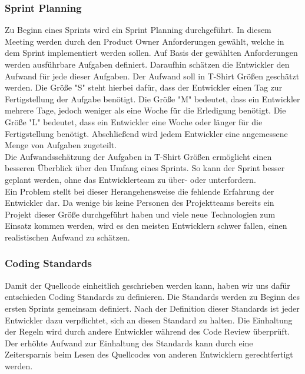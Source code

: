 \documentclass{article}
\begin{document}
\subsubsection{Sprint Planning}
Zu Beginn eines Sprints wird ein Sprint Planning durchgeführt.
In diesem Meeting werden durch den Product Owner Anforderungen gewählt, welche in dem Sprint implementiert werden sollen.
Auf Basis der gewählten Anforderungen werden ausführbare Aufgaben definiert.
Daraufhin schätzen die Entwickler den Aufwand für jede dieser Aufgaben.
Der Aufwand soll in T-Shirt Größen geschätzt werden.
Die Größe "S" steht hierbei dafür, dass der Entwickler einen Tag zur Fertigstellung der Aufgabe benötigt.
Die Größe "M" bedeutet, dass ein Entwickler mehrere Tage, jedoch weniger als eine Woche für die Erledigung benötigt.
Die Größe "L" bedeutet, dass ein Entwickler eine Woche oder länger für die Fertigstellung benötigt.
Abschließend wird jedem Entwickler eine angemessene Menge von Aufgaben zugeteilt.\\
Die Aufwandsschätzung der Aufgaben in T-Shirt Größen ermöglicht einen besseren Überblick über den Umfang eines Sprints.
So kann der Sprint besser geplant werden, ohne das Entwicklerteam zu über- oder unterfordern.\\
Ein Problem stellt bei dieser Herangehensweise die fehlende Erfahrung der Entwickler dar.
Da wenige bis keine Personen des Projektteams bereits ein Projekt dieser Größe durchgeführt haben und viele neue Technologien zum Einsatz kommen werden, wird es den meisten Entwicklern schwer fallen, einen realistischen Aufwand zu schätzen.

\subsubsection{Coding Standards}
Damit der Quellcode einheitlich geschrieben werden kann, haben wir uns dafür entschieden Coding Standards zu definieren.
Die Standards werden zu Beginn des ersten Sprints gemeinsam definiert.
Nach der Definition dieser Standards ist jeder Entwickler dazu verpflichtet, sich an diesen Standard zu halten.
Die Einhaltung der Regeln wird durch andere Entwickler während des Code Review überprüft.\\
Der erhöhte Aufwand zur Einhaltung des Standards kann durch eine Zeitersparnis beim Lesen des Quellcodes von anderen Entwicklern gerechtfertigt werden.
\end{document}
